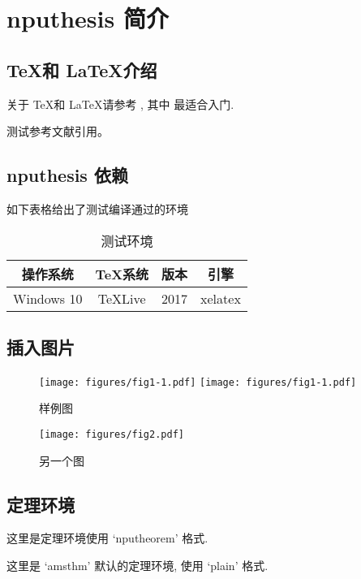 \chapter{nputhesis 简介}

\section{\TeX 和 \LaTeX 介绍}
关于 \TeX 和 \LaTeX 请参考 \cite{Knuth1986,Lamport1994,Liu2013}, 其中 \cite{Liu2013} 最适合入门.  

测试参考文献引用\cite{Zhang2018}。

\section{nputhesis 依赖}
如下表格给出了测试编译通过的环境
\begin{table}[h]
	\caption{测试环境\cite{Liu2013}}
	\centering
	\begin{tabular}{cccc}
		\toprule
		操作系统    & \TeX 系统   & 版本  & 引擎\\
		\midrule
		Windows 10  & TeXLive     & 2017  & xelatex\\
		\bottomrule
	\end{tabular}
\end{table}
\lipsum[9-15]
\section{插入图片}
\lipsum[1-3]
\begin{figure}
	\centering
	\texttt{[image: figures/fig1-1.pdf]}
	\texttt{[image: figures/fig1-1.pdf]}
	\caption{样例图}
\end{figure}
\begin{figure}
	\centering
	\texttt{[image: figures/fig2.pdf]}
	\caption{另一个图}
\end{figure}
\lipsum[4-6]
\section{定理环境}
\lipsum[1]
\begin{thm}
	这里是定理环境使用 `nputheorem' 格式.
\end{thm}
\lipsum[2]
\begin{oldthm}
	这里是 `amsthm' 默认的定理环境, 使用 `plain' 格式.
\end{oldthm}
\lipsum[3]


